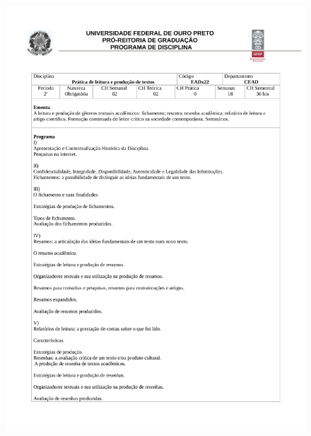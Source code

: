 \begin{figure}[p]
	\centering 
	\includegraphics[scale=0.7]{capitulos/anexo1-programas-disciplina/p23.pdf}
\end{figure}

